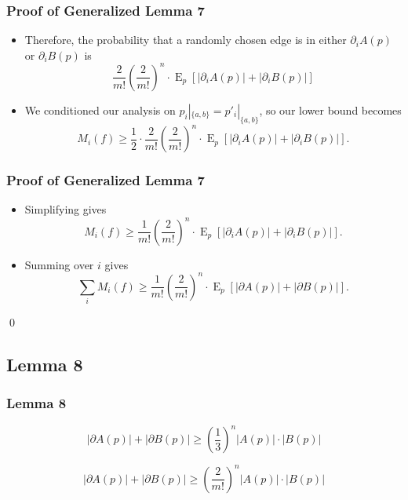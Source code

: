 \documentclass[aspectratio=169]{beamer}
\DeclareMathOperator{\expectedvalue}{E}
\begin{document}
		\begin{frame}
			\frametitle{Proof of Generalized Lemma 7}

			\begin{itemize}
				\item Therefore, the probability that a randomly chosen edge is in either $\partial_i A(p)$ or $\partial_i B(p)$ is
					\[
						\frac{2}{m!} \left(\frac{2}{m!}\right)^{n} \cdot \expectedvalue_p \left[ |\partial_i A(p)| + |\partial_i B(p)| \right]
					\]
				\item We conditioned our analysis on $p_i|_{\{a,b\}} = p'_i|_{\{a,b\}}$, so our lower bound becomes
					\[
						M_i(f) \ge \frac{1}{2} \cdot \frac{2}{m!}\left(\frac{2}{m!}\right)^{n} \cdot \expectedvalue_p \left[ |\partial_i A(p)| + |\partial_i B(p)| \right].
					\]
			\end{itemize}
		\end{frame}

		\begin{frame}
			\frametitle{Proof of Generalized Lemma 7}

			\begin{itemize}
				\item Simplifying gives
					\[
						M_i(f) \ge \frac{1}{m!}\left(\frac{2}{m!}\right)^{n} \cdot \expectedvalue_p \left[ |\partial_i A(p)| + |\partial_i B(p)| \right].
					\]
				\item Summing over $i$ gives
					\[
						\sum_i M_i(f) \ge \frac{1}{m!}\left(\frac{2}{m!}\right)^{n} \cdot \expectedvalue_p \left[ |\partial A(p)| + |\partial B(p)| \right].
					\]
			\end{itemize}

			\qed
		\end{frame}


	\subsection{Lemma 8}

		\begin{frame}
			\frametitle{Lemma 8}

			\begin{lemma}
				\[
					|\partial A(p)| + |\partial B(p)| \ge \left( \frac{1}{3} \right)^n |A(p)| \cdot |B(p)|
				\]
			\end{lemma}

			\begin{lemma}
				\[
					|\partial A(p)| + |\partial B(p)| \ge \left( \frac{2}{m!} \right)^n |A(p)| \cdot |B(p)|
				\]
			\end{lemma}

		\end{frame}
\end{document}
